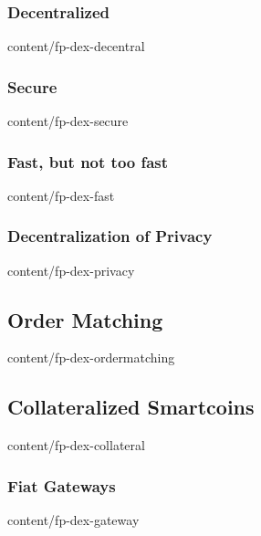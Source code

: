 \documentclass[conference,final,10pt,a4paper]{IEEEtran}
\begin{document}
\subsubsection  { Decentralized                                    }  { content/fp-dex-decentral       } 
\subsubsection  { Secure                                           }  { content/fp-dex-secure          } 
\subsubsection  { Fast, but not too fast                           }  { content/fp-dex-fast            } 
\subsubsection  { Decentralization of Privacy                      }  { content/fp-dex-privacy         } 
\subsection     { Order Matching                                   }  { content/fp-dex-ordermatching   } 
\subsection     { Collateralized Smartcoins                        }  { content/fp-dex-collateral      } 
\subsubsection  { Fiat Gateways                                    }  { content/fp-dex-gateway         } 
\end{document}
